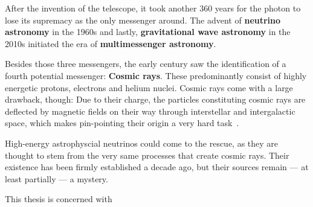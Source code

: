 After the invention of the telescope, it took another 360 years for the photon to lose its supremacy as the only messenger around. The advent of \textbf{neutrino astronomy} in the 1960s and lastly, \textbf{gravitational wave astronomy} in the 2010s initiated the era of \textbf{multimessenger astronomy}.

Besides those three messengers, the early  century saw the identification of a fourth potential messenger: \textbf{Cosmic rays}. These predominantly consist of highly energetic protons, electrons and helium nuclei. Cosmic rays come with a large drawback, though: Due to their charge, the particles constituting cosmic rays are deflected by magnetic fields on their way through interstellar and intergalactic space, which makes pin-pointing their origin a very hard task~\cite{Beckman2021}.

High-energy astrophyscial neutrinos could come to the rescue, as they are thought to stem from the very same processes that create cosmic rays. Their existence has been firmly established a decade ago, but their sources remain --- at least partially --- a mystery.

This thesis is concerned with